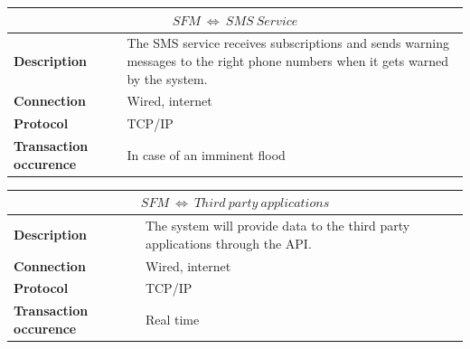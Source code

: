 
\begin{table}[!htbp]
	\centering
	\begin{tabular}{L{} L{}}
		\toprule
		 \\ \midrule
		\textbf{Description}           & The SMS service receives subscriptions and sends warning messages to the right phone numbers when it gets warned by the system. \\
		\textbf{Connection}            & Wired, internet                                                                                                                 \\
		\textbf{Protocol}              & TCP/IP                                                                                                                          \\
		\textbf{Transaction occurence} & In case of an imminent flood                                                                                                    \\
		\bottomrule
	\end{tabular}
\end{table}

\begin{table}[!htbp]
	\centering
	\begin{tabular}{L{} L{}}
		\toprule
		 \\ \midrule
		\textbf{Description}           & The system will provide data to the third party applications through the API. \\
		\textbf{Connection}            & Wired, internet                                                               \\
		\textbf{Protocol}              & TCP/IP                                                                        \\
		\textbf{Transaction occurence} & Real time                                                                     \\
		\bottomrule
	\end{tabular}
\end{table}

